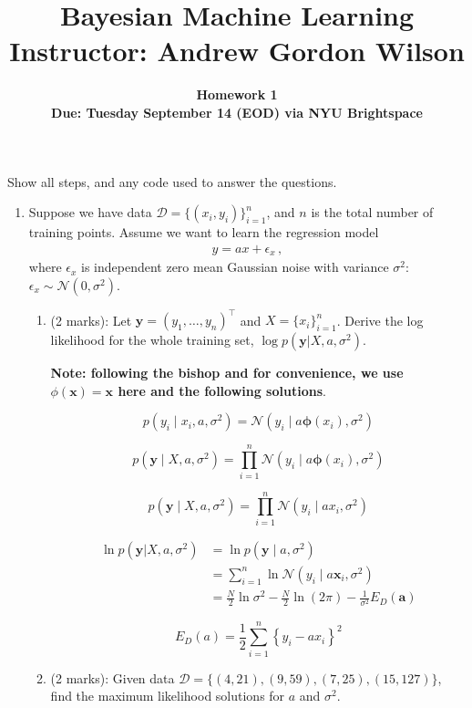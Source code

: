 \documentclass[11pt]{article}
\title{\vspace{-20mm} Bayesian Machine Learning \\ \vspace{5mm}  \normalsize Instructor: Andrew Gordon Wilson}
\date{}
\author{
\textbf{Homework 1} \\ \textbf{Due: Tuesday September 14 (EOD) via NYU Brightspace} }
\newcommand{\mbf}[1]{{\boldsymbol{\mathbf{#1}}}}
\renewcommand{\bm}{\mbf}
\begin{document}
\maketitle

Show all steps, and any code used to answer the questions.

\begin{enumerate}
\item Suppose we have data $\mathcal{D} = \{(x_i, y_i)\}_{i=1}^{n}$, and $n$ is the total number
of training points.  Assume we want to learn the regression model
\begin{align}
y = a x  + \epsilon_x \,,  \label{eqn: first}
\end{align}
where $\epsilon_x$ is independent zero mean Gaussian noise with variance $\sigma^2$: 
$\epsilon_x \sim \mathcal{N}(0,\sigma^2)$.
\begin{enumerate}[label=(\alph*)]
\item (2 marks): Let $\bm{y} = (y_1,\dots,y_n)^{\top}$ and $X = \{x_i\}_{i=1}^{n}$.  Derive the 
log likelihood for the whole training set, $\log p(\bm{y} | X, a, \sigma^2)$.

\textbf{Note: following the bishop and for convenience, we use $\phi(\mathbf{x})=\mathbf{x}$ here and the following solutions}.

$$
p(y_i \mid x_i, a, \sigma^2)=\mathcal{N} \left(y_i \mid a\boldsymbol{\phi}\left({x}_{i}\right), \sigma^2 \right)
$$

$$
p(\mathbf{y} \mid {X}, {a}, \sigma^2)=\prod_{i=1}^{n} \mathcal{N}\left(y_{i} \mid {a} \boldsymbol{\phi}\left({x}_{i}\right), \sigma^2 \right)
$$

$$
p(\mathbf{y} \mid {X}, {a}, \sigma^2)=\prod_{i=1}^{n} \mathcal{N}\left(y_{i} \mid {a} {x}_{i}, \sigma^2 \right)
$$


$$
\begin{aligned}
\ln p(\bm{y} | X, a, \sigma^2) &= \ln p(\mathbf{y} \mid a, \sigma^2) \\
&=\sum_{i=1}^{n} \ln \mathcal{N}\left(y_{i} \mid a \mathbf{x}_{i}, \sigma^2\right) \\
&=\frac{N}{2} \ln \sigma^2 -\frac{N}{2} \ln (2 \pi)- \frac{1}{\sigma^2} E_{D}(\mathbf{a})
\end{aligned}
$$

$$
E_{D}(a)=\frac{1}{2} \sum_{i=1}^{n}\left\{ y_{i}-ax_i \right\}^{2}
$$

\item (2 marks): Given data $\mathcal{D} = \{(4,21), (9,59), (7,25), (15,127)\}$, find the maximum
likelihood solutions for $a$ and $\sigma^2$.


\end{enumerate}
\end{enumerate}
\end{document}
